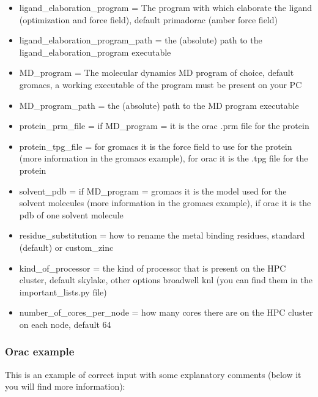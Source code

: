 \begin{itemize}
				\item ligand\_elaboration\_program = The program with which elaborate the ligand (optimization and force field), default primadorac (amber force field)
				
				\item ligand\_elaboration\_program\_path = the (absolute) path to the ligand\_elaboration\_program executable

				
				\item MD\_program = The molecular dynamics MD program of choice, default gromacs, a working executable of the program must be present on your PC
				
				\item MD\_program\_path = the (absolute) path to the MD program executable
				
				\item protein\_prm\_file = if MD\_program = it is the orac .prm file for the protein
				
				\item protein\_tpg\_file = for gromacs it is the force field to use for the protein (more information in the gromacs example), for orac it is the .tpg file for the protein
				
				\item solvent\_pdb = if MD\_program = gromacs it is the model used for the solvent molecules (more information in the gromacs example), if orac it is the pdb of one solvent molecule

				\item residue\_substitution = how to rename the metal binding residues, standard (default) or custom\_zinc\cite{zinc_substitutions}
				
				\item kind\_of\_processor = the kind of processor that is present on the HPC cluster, default skylake, other options broadwell knl (you can find them in the important\_lists.py file)
				
				\item number\_of\_cores\_per\_node = how many cores there are on the HPC cluster on each node, default 64
				
			\end{itemize}
	
				\subsubsection*{Orac example}
				
					This is an example of correct input with some explanatory comments (below it you will find more information):
					
